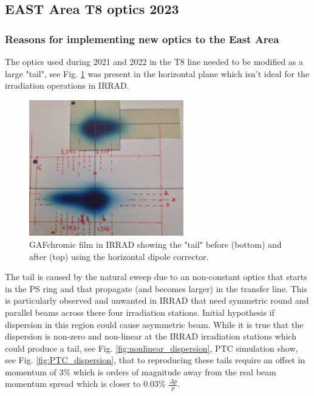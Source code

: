 \subsection{EAST Area T8 optics 2023}


\subsubsection{Reasons for implementing new optics to the East Area}

The optics used during 2021 and 2022 in the T8 line needed to be modified as a large "tail", see Fig. \ref{fig:tail_irrad} was present in the horizontal plane which isn't ideal for the irradiation operations in IRRAD.
\\

\begin{figure}[H]
\centering
\includegraphics[width=0.6\textwidth]{03_Empirical_Measurements/images/tail_irrad.png}
\caption{GAFchromic film in IRRAD showing the "tail" before (bottom) and after (top) using the horizontal dipole corrector.}
\label{fig:tail_irrad}
\end{figure}

The tail is caused by the natural sweep due to an non-constant optics that starts in the PS ring and that propagate (and becomes larger) in the transfer line. This is particularly observed and unwanted in IRRAD that need symmetric round and parallel beams across there four irradiation stations. Initial hypothesis if dispersion in this region could cause asymmetric beam. While it is true that the dispersion is non-zero and non-linear at the IRRAD irradiation stations which could produce a tail, see Fig. \ref{fig:nonlinear_dispersion}, PTC simulation show, see Fig. \ref{fig:PTC_dispersion}, that to reproducing these tails require an offset in momentum of 3\% which is orders of magnitude away from the real beam momentum spread which is closer to 0.03\% $\frac{\Delta p}{p}$.

